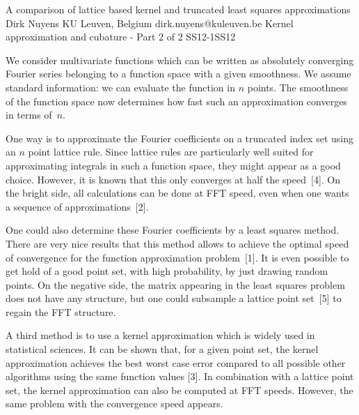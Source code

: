 \begin{talk}
  {A comparison of lattice based kernel and truncated least squares approximations}%
  {Dirk Nuyens}%
  {KU Leuven, Belgium}%
  {dirk.nuyens@kuleuven.be}%
  {}%
{Kernel approximation and cubature - Part 2 of 2}
{}{SS12-1}{SS12}

			
We consider multivariate functions which can be written as absolutely converging Fourier series belonging to a function space with a given smoothness. We assume standard information: we can evaluate the function in $n$ points. The smoothness of the function space now determines how fast such an approximation converges in terms of~$n$.

One way is to approximate the Fourier coefficients on a truncated index set using an $n$ point lattice rule. Since lattice rules are particularly well suited for approximating integrals in such a function space, they might appear as a good choice. However, it is known that this only converges at half the speed~[4]. On the bright side, all calculations can be done at FFT speed, even when one wants a sequence of approximations~[2].

One could also determine these Fourier coefficients by a least squares method. There are very nice results that this method allows to achieve the optimal speed of convergence for the function approximation problem~[1]. It is even possible to get hold of a good point set, with high probability, by just drawing random points. On the negative side, the matrix appearing in the least squares problem does not have any structure, but one could subsample a lattice point set~[5] to regain the FFT structure.

A third method is to use a kernel approximation which is widely used in statistical sciences. It can be shown that, for a given point set, the kernel approximation achieves the best worst case error compared to all possible other algorithms using the same function values [3]. In combination with a lattice point set, the kernel approximation can also be computed at FFT speeds. However, the same problem with the convergence speed appears.


\end{talk}

